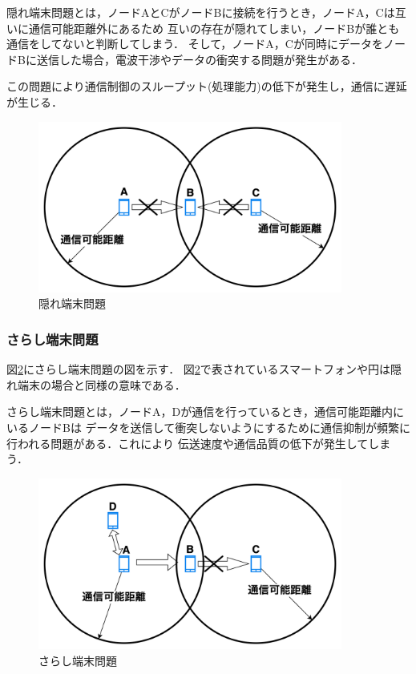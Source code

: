 \documentclass[a4paper, 11pt]{ltjsarticle}
\begin{document}
隠れ端末問題とは，ノードAとCがノードBに接続を行うとき，ノードA，Cは互いに通信可能距離外にあるため
互いの存在が隠れてしまい，ノードBが誰とも通信をしてないと判断してしまう．
そして，ノードA，Cが同時にデータをノードBに送信した場合，電波干渉やデータの衝突する問題が発生がある．

この問題により通信制御のスループット(処理能力)の低下が発生し，通信に遅延が生じる．
\begin{figure}[H]
  \centering
  \includegraphics[width=100mm]{hidden_terminal_problem.png}
  \caption{隠れ端末問題}
  \label{hidden_problem}
\end{figure}

\subsubsection{さらし端末問題}
図\ref{exposed_problem}にさらし端末問題の図を示す．
図\ref{exposed_problem}で表されているスマートフォンや円は隠れ端末の場合と同様の意味である．

さらし端末問題とは，ノードA，Dが通信を行っているとき，通信可能距離内にいるノードBは
データを送信して衝突しないようにするために通信抑制が頻繁に行われる問題がある．これにより
伝送速度や通信品質の低下が発生してしまう．
\begin{figure}[H]
  \centering
  \includegraphics[width=100mm]{exposed_terminal_problem.png}
  \caption{さらし端末問題}
  \label{exposed_problem}
\end{figure}
\end{document}
